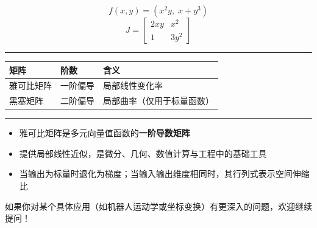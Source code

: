 \label{ux4f8b2ux7b80ux5355ux975eux7ebfux6027ux6620ux5c04mathbbr2-to-mathbbr2}

\[
f(x,y) = (x^2 y,\; x + y^3)
\] \[
J = \begin{bmatrix}
2xy & x^2 \\
1   & 3y^2
\end{bmatrix}
\]

\begin{center}\rule{0.5\linewidth}{0.5pt}\end{center}

\label{ux4e0eux9ed1ux585eux77e9ux9635ux7684ux533aux522b}


\begin{tabular}{lll}
\toprule
矩阵 & 阶数 & 含义 \\
\midrule
雅可比矩阵 & 一阶偏导 & 局部线性变化率 \\
黑塞矩阵 & 二阶偏导 & 局部曲率（仅用于标量函数） \\
\bottomrule
\end{tabular}

\begin{center}\rule{0.5\linewidth}{0.5pt}\end{center}

\label{ux603bux7ed3}

\begin{itemize}
\tightlist
\item
  雅可比矩阵是多元向量值函数的\textbf{一阶导数矩阵}
\item
  提供局部线性近似，是微分、几何、数值计算与工程中的基础工具
\item
  当输出为标量时退化为梯度；当输入输出维度相同时，其行列式表示空间伸缩比
\end{itemize}

如果你对某个具体应用（如机器人运动学或坐标变换）有更深入的问题，欢迎继续提问！
